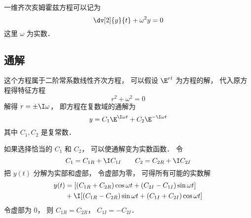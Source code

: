 


一维齐次亥姆霍兹方程可以记为
\begin{equation}
\dv[2]{y}{t} + \omega^2 y = 0
\end{equation}
这里 $\omega$ 为实数．

\subsection{通解}
这个方程属于二阶常系数线性齐次方程， 可以假设 $\E^{rt}$ 为方程的解， 代入原方程得特征方程
\begin{equation}
r^2 + \omega^2 = 0
\end{equation}
解得 $r = \pm \I \omega$， 即方程在复数域的通解为
\begin{equation}
y = C_1 \E^{\I\omega t} + C_2 \E^{-\I\omega t}
\end{equation}
其中 $C_1, C_2$ 是复常数．

如果选择恰当的 $C_1$ 和 $C_2$， 可以使通解变为实数函数． 令
\begin{equation}
C_1 = C_{1R} + \I C_{1I} \qquad
C_2 = C_{2R} + \I C_{2I}
\end{equation}
把 $y(t)$ 分解为实部和虚部， 令虚部为零， 可得所有可能的实数解
\begin{equation}
\begin{aligned}
y(t) &= [(C_{1R} + C_{2R}) \cos\omega t + (C_{2I} - C_{1I}) \sin\omega t] \\
& + \I [(C_{1R} - C_{2R}) \sin \omega t + (C_{1I} + C_{2I}) \cos \omega t]
\end{aligned}
\end{equation}
令虚部为 $0$， 则 $C_{1R} = C_{2R}$， $C_{1I} = -C_{2I}$．
